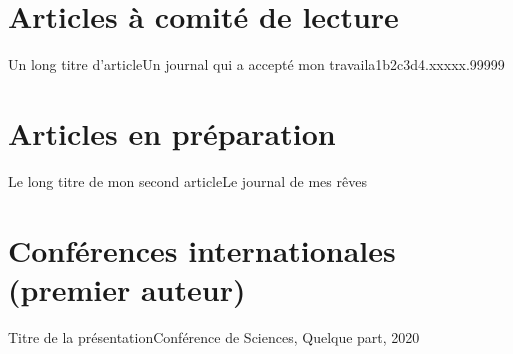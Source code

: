 
\section*{Articles à comité de lecture}


{Un long titre d'article}{Un journal qui a accepté mon travail}{a1b2c3d4.xxxxx.99999}

\section*{Articles en préparation}

{Le long titre de mon second article}{Le journal de mes rêves}

\section*{Conférences internationales (premier auteur)}

{Titre de la présentation}{Conférence de Sciences, Quelque part, 2020}

